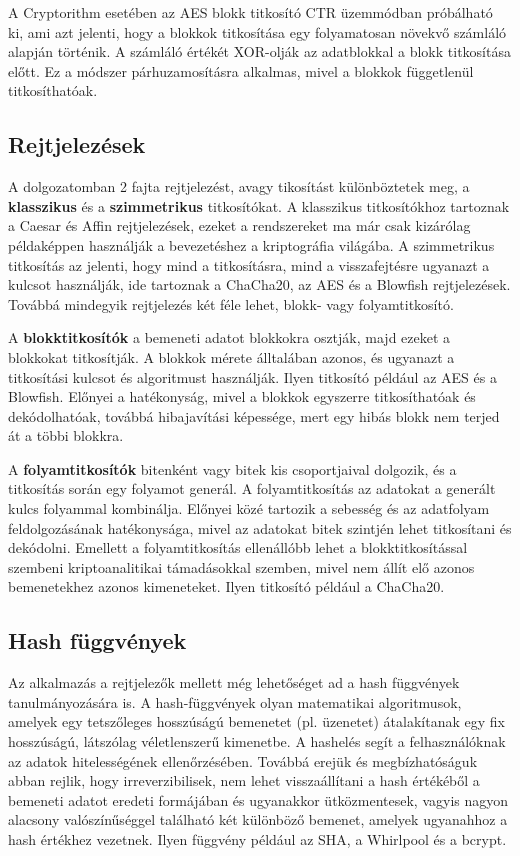 A Cryptorithm esetében az AES blokk titkosító CTR üzemmódban próbálható ki, ami azt jelenti, hogy a blokkok titkosítása egy folyamatosan növekvő számláló alapján történik. A számláló értékét XOR-olják az adatblokkal a blokk titkosítása előtt. Ez a módszer párhuzamosításra alkalmas, mivel a blokkok függetlenül titkosíthatóak.

\subsection{Rejtjelezések}
A dolgozatomban 2 fajta rejtjelezést, avagy tikosítást különböztetek meg, a \textbf{klasszikus} és a \textbf{szimmetrikus} titkosítókat. A klasszikus titkosítókhoz tartoznak a Caesar és Affin rejtjelezések, ezeket a rendszereket ma már csak kizárólag példaképpen használják a bevezetéshez a kriptográfia világába. A szimmetrikus titkosítás az jelenti, hogy mind a titkosításra, mind a visszafejtésre ugyanazt a kulcsot használják, ide tartoznak a ChaCha20, az AES és a Blowfish rejtjelezések. Továbbá mindegyik rejtjelezés két féle lehet, blokk- vagy folyamtitkosító.

A \textbf{blokktitkosítók} a bemeneti adatot blokkokra osztják, majd ezeket a blokkokat titkosítják. A blokkok mérete álltalában azonos, és ugyanazt a titkosítási kulcsot és algoritmust használják. Ilyen titkosító például az AES és a Blowfish. Előnyei a hatékonyság, mivel a blokkok egyszerre titkosíthatóak és dekódolhatóak, továbbá hibajavítási képessége, mert egy hibás blokk nem terjed át a többi blokkra.

A \textbf{folyamtitkosítók} bitenként vagy bitek kis csoportjaival dolgozik, és a titkosítás során egy folyamot generál. A folyamtitkosítás az adatokat a generált kulcs folyammal kombinálja. Előnyei közé tartozik a sebesség és az adatfolyam feldolgozásának hatékonysága, mivel az adatokat bitek szintjén lehet titkosítani és dekódolni. Emellett a folyamtitkosítás ellenállóbb lehet a blokktitkosítással szembeni kriptoanalitikai támadásokkal szemben, mivel nem állít elő azonos bemenetekhez azonos kimeneteket. Ilyen titkosító például a ChaCha20.

\pagebreak
\subsection{Hash függvények}
Az alkalmazás a rejtjelezők mellett még lehetőséget ad a hash függvények tanulmányozására is. A hash-függvények olyan matematikai algoritmusok, amelyek egy tetszőleges hosszúságú bemenetet (pl. üzenetet) átalakítanak egy fix hosszúságú, látszólag véletlenszerű kimenetbe. A hashelés segít a felhasználóknak az adatok hitelességének ellenőrzésében. Továbbá erejük és megbízhatóságuk abban rejlik, hogy irreverzibilisek, nem lehet visszaállítani a hash értékéből a bemeneti adatot eredeti formájában és ugyanakkor ütközmentesek, vagyis nagyon alacsony valószínűséggel található két különböző bemenet, amelyek ugyanahhoz a hash értékhez vezetnek. Ilyen függvény például az SHA, a Whirlpool és a bcrypt.


